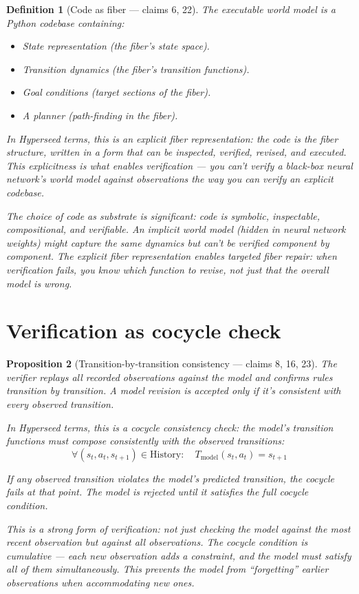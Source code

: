 \documentclass[11pt,a4paper]{article}
\newtheorem{definition}{Definition}[section]
\newtheorem{proposition}[definition]{Proposition}
\begin{document}
\begin{definition}[Code as fiber --- claims 6, 22]
\label{def:model}
The executable world model is a Python codebase containing:
\begin{itemize}
\item State representation (the fiber's state space).
\item Transition dynamics (the fiber's transition functions).
\item Goal conditions (target sections of the fiber).
\item A planner (path-finding in the fiber).
\end{itemize}

In Hyperseed terms, this is an \emph{explicit fiber representation}:
the code \emph{is} the fiber structure, written in a form that can
be inspected, verified, revised, and executed. This explicitness is
what enables verification --- you can't verify a black-box neural
network's world model against observations the way you can verify
an explicit codebase.

The choice of code as substrate is significant: code is symbolic,
inspectable, compositional, and verifiable. An implicit world model
(hidden in neural network weights) might capture the same dynamics
but can't be verified component by component. The explicit fiber
representation enables \emph{targeted fiber repair}: when verification
fails, you know which function to revise, not just that the overall
model is wrong.
\end{definition}

\section{Verification as cocycle check}
\label{sec:verify}

\begin{proposition}[Transition-by-transition consistency --- claims 8, 16, 23]
\label{prop:verify}
The verifier replays all recorded observations against the model and
confirms rules transition by transition. A model revision is accepted
only if it's consistent with \emph{every} observed transition.

In Hyperseed terms, this is a \emph{cocycle consistency check}: the
model's transition functions must compose consistently with the
observed transitions:
\[
  \forall (s_t, a_t, s_{t+1}) \in \text{History}: \quad
  T_{\text{model}}(s_t, a_t) = s_{t+1}
\]

If any observed transition violates the model's predicted transition,
the cocycle fails at that point. The model is rejected until it
satisfies the full cocycle condition.

This is a strong form of verification: not just checking the model
against the most recent observation but against \emph{all} observations.
The cocycle condition is cumulative --- each new observation adds a
constraint, and the model must satisfy all of them simultaneously.
This prevents the model from ``forgetting'' earlier observations when
accommodating new ones.
\end{proposition}
\end{document}

